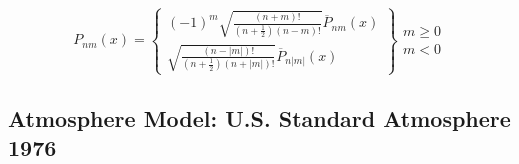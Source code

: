 \documentclass{article}
\begin{document}
\begin{equation}
P_{n m}{\left(x\right)} = \left\{\begin{array}{l}
\left(-1\right)^m \sqrt{\frac{\left(n + m\right)!}{\left(n + \frac{1}{2}\right) \left(n - m\right)!}} \overline{P}_{n m}{\left(x\right)} \\
\sqrt{\frac{\left(n - |m|\right)!}{\left(n + \frac{1}{2}\right) \left(n + |m|\right)!}} \overline{P}_{n |m|}{\left(x\right)}
\end{array}\right\} \begin{array}{l}
m \geq 0 \\
m < 0
\end{array}
\end{equation}

\subsection{Atmosphere Model: U.S. Standard Atmosphere 1976~\cite{noaa76}}


\newpage
\begin{bibdiv}
\begin{biblist}


\end{biblist}
\end{bibdiv}
\end{document}
